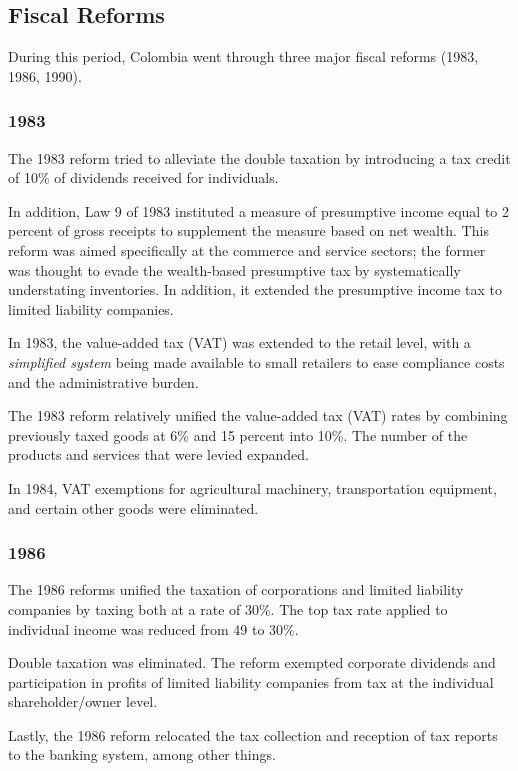 \documentclass[
  12pt]{article}
\theoremstyle{definition}
\theoremstyle{remark}
\begin{document}
\subsection{Fiscal Reforms}\label{fiscal-reforms}

During this period, Colombia went through three major fiscal reforms
(1983, 1986, 1990).

\subsubsection{1983}\label{section}

The 1983 reform tried to alleviate the double taxation by introducing a
tax credit of 10\% of dividends received for individuals.

In addition, Law 9 of 1983 instituted a measure of presumptive income
equal to 2 percent of gross receipts to supplement the measure based on
net wealth. This reform was aimed specifically at the commerce and
service sectors; the former was thought to evade the wealth-based
presumptive tax by systematically understating inventories. In addition,
it extended the presumptive income tax to limited liability companies.

In 1983, the value-added tax (VAT) was extended to the retail level,
with a \emph{simplified system} being made available to small retailers
to ease compliance costs and the administrative burden.

The 1983 reform relatively unified the value-added tax (VAT) rates by
combining previously taxed goods at 6\% and 15 percent into 10\%. The
number of the products and services that were levied expanded.

In 1984, VAT exemptions for agricultural machinery, transportation
equipment, and certain other goods were eliminated.

\subsubsection{1986}\label{section-1}

The 1986 reforms unified the taxation of corporations and limited
liability companies by taxing both at a rate of 30\%. The top tax rate
applied to individual income was reduced from 49 to 30\%.

Double taxation was eliminated. The reform exempted corporate dividends
and participation in profits of limited liability companies from tax at
the individual shareholder/owner level.

Lastly, the 1986 reform relocated the tax collection and reception of
tax reports to the banking system, among other things.
\end{document}
